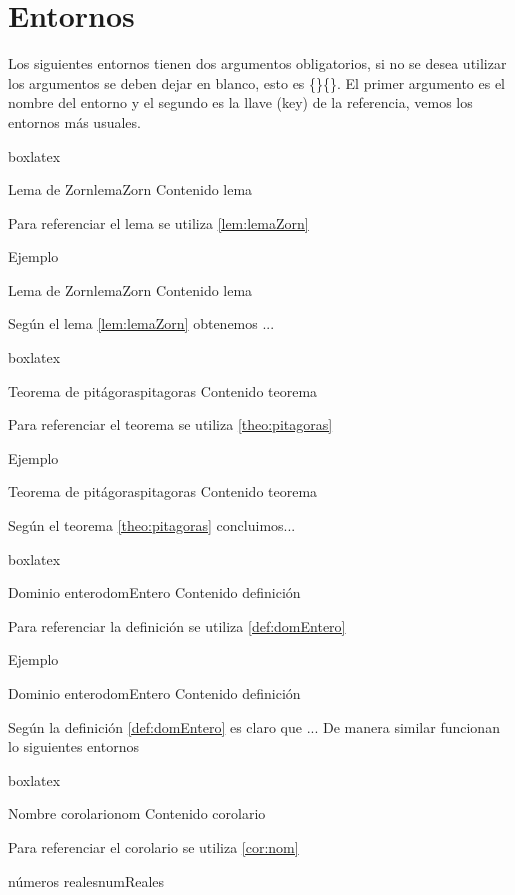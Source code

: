 {	\section{Entornos}
	Los siguientes entornos tienen dos argumentos obligatorios, si no se desea utilizar los argumentos se deben dejar en blanco, esto es \{\}\{\}. El primer argumento es el nombre del entorno y el segundo es la llave (key) de la referencia, vemos los entornos más usuales. 
	\begin{tcblisting}{boxlatex}
		\begin{mylem}{Lema de Zorn}{lemaZorn}
			Contenido lema
		\end{mylem}
		Para referenciar el lema se utiliza \ref{lem:lemaZorn}
	\end{tcblisting}
	Ejemplo
	\begin{mylem}{Lema de Zorn}{lemaZorn}
		Contenido lema
	\end{mylem}
	Según el lema \ref{lem:lemaZorn} obtenemos ...
	\begin{tcblisting}{boxlatex}
		\begin{mytheo}{Teorema de pitágoras}{pitagoras}
			Contenido teorema
		\end{mytheo}
		Para referenciar el teorema se utiliza \ref{theo:pitagoras}
	\end{tcblisting}
	Ejemplo
	\begin{mytheo}{Teorema de pitágoras}{pitagoras}
		Contenido teorema
	\end{mytheo}
	Según el teorema \ref{theo:pitagoras} concluimos...\pap
	\begin{tcblisting}{boxlatex}
		\begin{mydef}{Dominio entero}{domEntero}
			Contenido definición
		\end{mydef}
		Para referenciar la definición se utiliza \ref{def:domEntero}
	\end{tcblisting}
	Ejemplo
	\begin{mydef}{Dominio entero}{domEntero}
		Contenido definición
	\end{mydef}
	Según la definición \ref{def:domEntero} es claro que ...\pap
	De manera similar funcionan lo siguientes entornos
	\begin{tcblisting}{boxlatex}
		\begin{mycor}{Nombre corolario}{nom}
			Contenido corolario
		\end{mycor}
		Para referenciar el corolario se utiliza \ref{cor:nom}
		\begin{myprop}{números reales}{numReales}

\end{myprop}
\end{tcblisting}}

